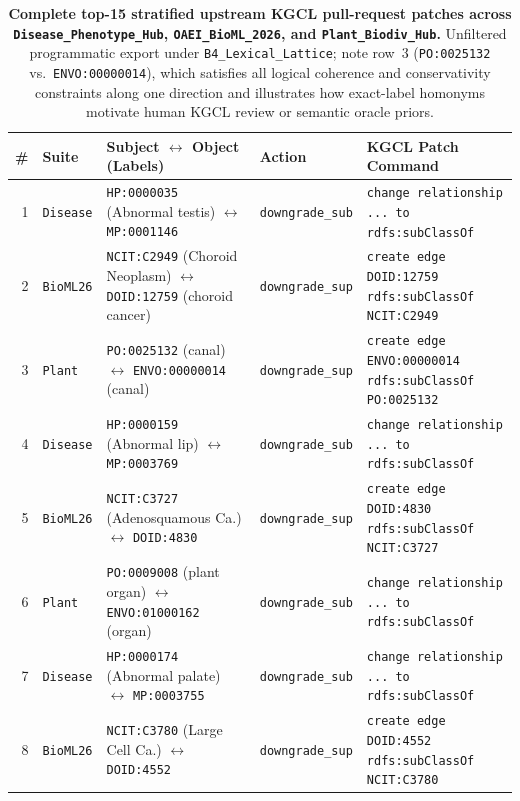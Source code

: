 \documentclass[10pt]{article}
\theoremstyle{accentthm}
\begin{document}
\begin{table}[htbp]
\centering
\caption{\textbf{Complete top-15 stratified upstream KGCL pull-request patches across \texttt{Disease\_Phenotype\_Hub}, \texttt{OAEI\_BioML\_2026}, and \texttt{Plant\_Biodiv\_Hub}.} Unfiltered programmatic export under \texttt{B4\_Lexical\_Lattice}; note row~3 (\texttt{PO:0025132} vs.\ \texttt{ENVO:00000014}), which satisfies all logical coherence and conservativity constraints along one direction and illustrates how exact-label homonyms motivate human KGCL review or semantic oracle priors.}
\label{tab:s2_top15}
\scriptsize
\setlength{\tabcolsep}{3.8pt}
\begin{tabularx}{\textwidth}{@{}rllp{1.9cm}>{\raggedright\arraybackslash}X@{}}
\toprule
\textbf{\#} & \textbf{Suite} & \textbf{Subject $\leftrightarrow$ Object (Labels)} & \textbf{Action} & \textbf{KGCL Patch Command} \\
\midrule
1 & \texttt{Disease} & \texttt{HP:0000035} (Abnormal testis) $\leftrightarrow$ \texttt{MP:0001146} & \texttt{downgrade\_sub} & \texttt{change relationship ... to rdfs:subClassOf} \\
2 & \texttt{BioML26} & \texttt{NCIT:C2949} (Choroid Neoplasm) $\leftrightarrow$ \texttt{DOID:12759} (choroid cancer) & \texttt{downgrade\_sup} & \texttt{create edge DOID:12759 rdfs:subClassOf NCIT:C2949} \\
3 & \texttt{Plant} & \texttt{PO:0025132} (canal) $\leftrightarrow$ \texttt{ENVO:00000014} (canal) & \texttt{downgrade\_sup} & \texttt{create edge ENVO:00000014 rdfs:subClassOf PO:0025132} \\
4 & \texttt{Disease} & \texttt{HP:0000159} (Abnormal lip) $\leftrightarrow$ \texttt{MP:0003769} & \texttt{downgrade\_sub} & \texttt{change relationship ... to rdfs:subClassOf} \\
5 & \texttt{BioML26} & \texttt{NCIT:C3727} (Adenosquamous Ca.) $\leftrightarrow$ \texttt{DOID:4830} & \texttt{downgrade\_sup} & \texttt{create edge DOID:4830 rdfs:subClassOf NCIT:C3727} \\
6 & \texttt{Plant} & \texttt{PO:0009008} (plant organ) $\leftrightarrow$ \texttt{ENVO:01000162} (organ) & \texttt{downgrade\_sub} & \texttt{change relationship ... to rdfs:subClassOf} \\
7 & \texttt{Disease} & \texttt{HP:0000174} (Abnormal palate) $\leftrightarrow$ \texttt{MP:0003755} & \texttt{downgrade\_sub} & \texttt{change relationship ... to rdfs:subClassOf} \\
8 & \texttt{BioML26} & \texttt{NCIT:C3780} (Large Cell Ca.) $\leftrightarrow$ \texttt{DOID:4552} & \texttt{downgrade\_sup} & \texttt{create edge DOID:4552 rdfs:subClassOf NCIT:C3780} \\

\end{tabularx}
\end{table}
\end{document}
